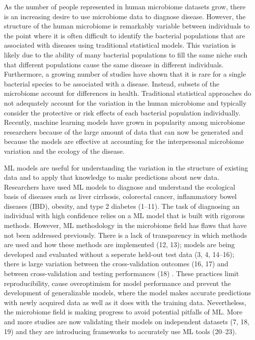 \documentclass[11pt,]{article}
\begin{document}
As the number of people represented in human microbiome datasets grow,
there is an increasing desire to use microbiome data to diagnose
disease. However, the structure of the human microbiome is remarkably
variable between individuals to the point where it is often difficult to
identify the bacterial populations that are associated with diseases
using traditional statistical models. This variation is likely due to
the ability of many bacterial populations to fill the same niche such
that different populations cause the same disease in different
individuals. Furthermore, a growing number of studies have shown that it
is rare for a single bacterial species to be associated with a disease.
Instead, subsets of the microbiome account for differences in health.
Traditional statistical approaches do not adequately account for the
variation in the human microbiome and typically consider the protective
or risk effects of each bacterial population individually. Recently,
machine learning models have grown in popularity among microbiome
researchers because of the large amount of data that can now be
generated and because the models are effective at accounting for the
interpersonal microbiome variation and the ecology of the disease.

ML models are useful for understanding the variation in the structure of
existing data and to apply that knowledge to make predictions about new
data. Researchers have used ML models to diagnose and understand the
ecological basis of diseases such as liver cirrhosis, colorectal cancer,
inflammatory bowel diseases (IBD), obesity, and type 2 diabetes (1--11).
The task of diagnosing an individual with high confidence relies on a ML
model that is built with rigorous methods. However, ML methodology in
the microbiome field has flaws that have not been addressed previously.
There is a lack of transparency in which methods are used and how these
methods are implemented (12, 13); models are being developed and
evaluated without a seperate held-out test data (3, 4, 14--16); there is
large variation between the cross-validation outcomes (16, 17) and
between cross-validation and testing performances (18) . These practices
limit reproducibility, cause overoptimism for model performance and
prevent the development of generalizable models, where the model makes
accurate predictions with newly acquired data as well as it does with
the training data. Nevertheless, the microbiome field is making progress
to avoid potential pitfalls of ML. More and more studies are now
validating their models on independent datasets (7, 18, 19) and they are
introducing frameworks to accurately use ML tools (20--23).
\end{document}
